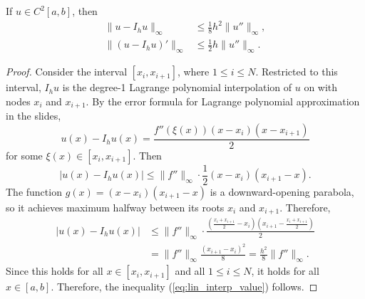 \documentclass{homework}
\begin{document}
	\question
	If $u \in C^2[a,b]$, then
	\begin{align}
		\label{eq:lin_interp_value}
		\lVert u - I_hu\rVert_\infty &\le \frac{1}{8}h^2\lVert u'' \rVert_\infty,\\
		\label{eq:lin_interp_deriv}
		\lVert (u - I_hu)'\rVert_\infty &\le \frac{1}{2}h\lVert u''\rVert_\infty.
	\end{align}
	\begin{proof}
		Consider the interval $[x_i, x_{i+1}]$, where $1 \le i \le N$. Restricted to this interval, $I_hu$ is the degree-1 Lagrange polynomial interpolation of $u$ on with nodes $x_i$ and $x_{i+1}$. By the error formula for Lagrange polynomial approximation in the slides,
		\begin{equation}
			u(x) - I_hu(x) = \frac{f''(\xi(x))(x-x_i)(x-x_{i+1})}{2}
		\end{equation}
		for some $\xi(x) \in [x_i,x_{i+1}]$. Then
		\begin{equation}
			|u(x) - I_hu(x)| \le \lVert f''\rVert_\infty \cdot \frac{1}{2}(x-x_i)(x_{i+1}-x).
		\end{equation}
		The function $g(x) = (x-x_i)(x_{i+1} -x)$ is a downward-opening parabola, so it achieves maximum halfway between its roots $x_i$ and $x_{i+1}$. Therefore,
		\begin{align}
			|u(x) - I_hu(x)| &\le \lVert f'' \rVert_\infty \cdot\frac{\left(\frac{x_i + x_{i+1}}{2} - x_i\right)\left(x_{i+1}-\frac{x_i + x_{i+1}}{2}\right)}{2} \\
			&=  \lVert f''\rVert_\infty \frac{(x_{i+1} - x_i)^2}{8} = \frac{h^2}{8}\lVert f''\rVert_\infty.
		\end{align}
		Since this holds for all $x \in [x_i, x_{i+1}]$ and all $1\le i \le N$, it holds for all $x \in [a,b]$. Therefore, the inequality (\ref{eq:lin_interp_value}) follows.
		

\end{proof}
\end{document}
